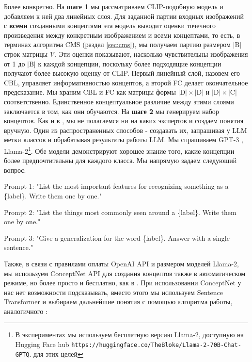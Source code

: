 Более конкретно. На \textbf{шаге 1} мы рассматриваем CLIP-подобную модель и добавляем к ней два линейных слоя. Для заданной партии входных изображений с \textbf{всеми} созданными концептами эта модель выводит оценки точечного произведения между конкретным изображением и всеми концептами, то есть, в терминах алгоритма CMS (раздел \ref{sec:cms}), мы получаем партию размером $|\mathrm{B}|$ строк матрицы $\mathcal{V}$. Эти оценки показывают, насколько чувствительны изображения от 1 до $|\mathrm{B}|$ к каждой концепции, поскольку более подходящие концепции получают более высокую оценку от CLIP. Первый линейный слой, назовем его CBL, управляет информативностью концептов, а второй FC делает окончательное предсказание. Мы храним CBL и FC как матрицы формы $|\mathrm{D}|\times|\mathrm{D}|$ и $|\mathrm{D}|\times|\mathrm{C}|$ соответственно. Единственное концептуальное различие между этими слоями заключается в том, как они обучаются. На \textbf{шаге 2} мы генерируем набор концептов. Как и в \cite{oikarinen2023labelfree}, мы не полагаемся ни на каких экспертов и создаем понятия вручную. Один из распространенных способов - создавать их, запрашивая у LLM метки классов и обрабатывая результаты работы LLM. Мы спрашиваем GPT-3 \cite{brown2020language}, Llama-2\footnote{В экспериментах мы используем бесплатную версию Llama-2, доступную на Hugging Face hub \texttt{https://huggingface.co/TheBloke/Llama-2-70B-Chat-GPTQ}. \cite{touvron2023llama} для этих целей}. Обе модели демонстрируют хорошее знание того, какие концепции более предпочтительны для каждого класса. Мы напрямую задаем следующий вопрос:

Prompt 1: "List the most important features for recognizing something as a \{label\}. Write them one by one."

Prompt 2: "List the things most commonly seen around a \{label\}. Write them one by one."

Prompt 3: "Give a generalization for the word \{label\}. Answer with a single sentence."

Также, в связи с правилами оплаты OpenAI API и размером моделей Llama-2, мы используем ConceptNet API \cite{article} для создания концептов также в автоматическом режиме, но более просто и бесплатно, как в \cite{oikarinen2023labelfree,yuksekgonul2023posthoc}. При использовании ConceptNet у нас нет возможности подсказывать, вместо этого мы используем Sentence Transformer \cite{reimers-2019-sentence-bert} и выбираем дальнейшие понятия с помощью алгоритма работы, аналогичного \cite{oikarinen2023labelfree}:

